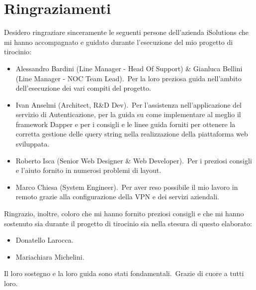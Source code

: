 \chapter*{Ringraziamenti}
Desidero ringraziare sinceramente le seguenti persone dell'azienda iSolutions che mi hanno 
accompagnato e guidato durante l'esecuzione del mio progetto di tirocinio:
\begin{itemize}
    \item Alessandro Bardini (Line Manager \-- Head Of Support) \& Gianluca Bellini (Line Manager \-- NOC Team Lead).\ Per la loro preziosa guida nell'ambito dell'esecuzione dei vari compiti del progetto.
    \item Ivan Anselmi (Architect, R\&D Dev).\ Per l'assistenza nell'applicazione del servizio di Autenticazione, per la guida su come implementare al meglio il framework Dapper e per i consigli e le linee guida forniti per ottenere la corretta gestione delle query string nella realizzazione della piattaforma web sviluppata.
    \item Roberto Isca (Senior Web Designer \& Web Developer).\ Per i preziosi consigli e l'aiuto fornito in numerosi problemi di layout.
    \item Marco Chiesa (System Engineer).\ Per aver reso possibile il mio lavoro in remoto grazie alla configurazione della VPN e dei servizi aziendali.
\end{itemize}
%
Ringrazio, inoltre, coloro che mi hanno fornito preziosi consigli e che mi hanno sostenuto sia durante il progetto di tirocinio sia nella stesura di questo elaborato:
\begin{itemize}
    \item Donatello Larocca.
    \item Mariachiara Michelini.
\end{itemize}
%
Il loro sostegno e la loro guida sono stati fondamentali.\ Grazie di cuore a tutti loro.
